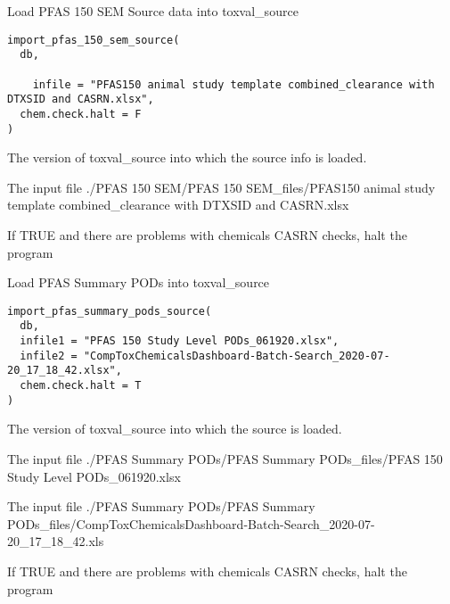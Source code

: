 \documentclass[letterpaper]{book}
\begin{document}
%
\begin{Description}\relax
Load PFAS 150 SEM Source data into toxval\_source
\end{Description}
%
\begin{Usage}
\begin{verbatim}
import_pfas_150_sem_source(
  db,
 
    infile = "PFAS150 animal study template combined_clearance with DTXSID and CASRN.xlsx",
  chem.check.halt = F
)
\end{verbatim}
\end{Usage}
%
\begin{Arguments}
\begin{ldescription}
\item[\code{db}] The version of toxval\_source into which the source info is loaded.

\item[\code{infile}] The input file ./PFAS 150 SEM/PFAS 150 SEM\_files/PFAS150 animal study template combined\_clearance with DTXSID and CASRN.xlsx

\item[\code{chem.check.halt}] If TRUE and there are problems with chemicals CASRN checks, halt the program
\end{ldescription}
\end{Arguments}
%
\begin{Description}\relax
Load PFAS Summary PODs into toxval\_source
\end{Description}
%
\begin{Usage}
\begin{verbatim}
import_pfas_summary_pods_source(
  db,
  infile1 = "PFAS 150 Study Level PODs_061920.xlsx",
  infile2 = "CompToxChemicalsDashboard-Batch-Search_2020-07-20_17_18_42.xlsx",
  chem.check.halt = T
)
\end{verbatim}
\end{Usage}
%
\begin{Arguments}
\begin{ldescription}
\item[\code{db}] The version of toxval\_source into which the source is loaded.

\item[\code{infile1}] The input file ./PFAS Summary PODs/PFAS Summary PODs\_files/PFAS 150 Study Level PODs\_061920.xlsx

\item[\code{infile2}] The input file ./PFAS Summary PODs/PFAS Summary PODs\_files/CompToxChemicalsDashboard-Batch-Search\_2020-07-20\_17\_18\_42.xls

\item[\code{chem.check.halt}] If TRUE and there are problems with chemicals CASRN checks, halt the program
\end{ldescription}
\end{Arguments}
\end{document}
